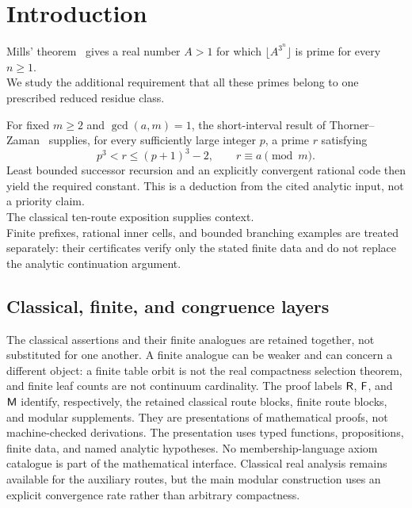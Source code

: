 \documentclass[11pt,reqno]{amsart}
\makeatletter
\theoremstyle{blueplain}
\newcounter{type}
\newcounter{asser}
\renewenvironment{quotation}
{\list{}{\listparindent\z@
		\itemindent\z@
		\rightmargin\leftmargin
		\parsep\z@}	\item\relax}
{\endlist}
\numberwithin{equation}{section}
\makeatother
\begin{document}
\section{Introduction}
\begin{quotation}
Mills' theorem~\cite{Mills1947} gives a real number \(A>1\) for which
\(\lfloor A^{3^n}\rfloor\) is prime for every \(n\ge1\).\\
We study the additional requirement that all these primes belong to
one prescribed reduced residue class.

For fixed \(m\ge2\) and \(\gcd(a,m)=1\), the short-interval result of
Thorner--Zaman~\cite{ThornerZaman2024} supplies, for every sufficiently
large integer \(p\), a prime \(r\) satisfying
\[
p^3<r\le(p+1)^3-2,
\qquad r\equiv a\pmod m.
\]
Least bounded successor recursion and an explicitly convergent rational
code then yield the required constant. This is a deduction from the cited analytic input,
not a priority claim.\\

The classical ten-route exposition supplies context.\\
Finite prefixes, rational inner cells, and bounded branching examples
are treated separately: their certificates verify only the stated
finite data and do not replace the analytic continuation argument.

\end{quotation}

\subsection{Classical, finite, and congruence layers}\label{sec:merged-scope}
The classical assertions and their finite analogues are retained together,
not substituted for one another. A finite analogue can be weaker and can
concern a different object: a finite table orbit is not the real compactness
selection theorem, and finite leaf counts are not continuum cardinality.
The proof labels \(\textsf R\), \(\textsf F\), and \(\textsf M\) identify,
respectively, the retained classical route blocks, finite route blocks,
and modular supplements. They are presentations of mathematical proofs,
not machine-checked derivations. The presentation uses typed functions,
propositions, finite data, and named analytic hypotheses. No membership-language
axiom catalogue is part of the mathematical interface. Classical real analysis
remains available for the auxiliary routes, but the main modular construction
uses an explicit convergence rate rather than arbitrary compactness.
\end{document}

